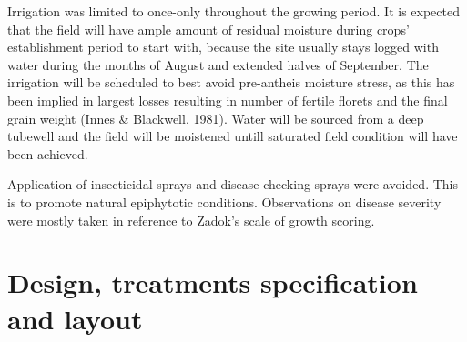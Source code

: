 \documentclass[12pt,oneside]{dukestatscithesis} %
\begin{document}
Irrigation was limited to once-only throughout the growing period. It is expected that the field will have ample amount of residual moisture during crops' establishment period to start with, because the site usually stays logged with water during the months of August and extended halves of September. The irrigation will be scheduled to best avoid pre-antheis moisture stress, as this has been implied in largest losses resulting in number of fertile florets and the final grain weight (Innes \& Blackwell, 1981). Water will be sourced from a deep tubewell and the field will be moistened untill saturated field condition will have been achieved.

Application of insecticidal sprays and disease checking sprays were avoided. This is to promote natural epiphytotic conditions. Observations on disease severity were mostly taken in reference to Zadok's scale of growth scoring.

\hypertarget{design-treatments-specification-and-layout}{%
\section{Design, treatments specification and layout}\label{design-treatments-specification-and-layout}}
\end{document}
